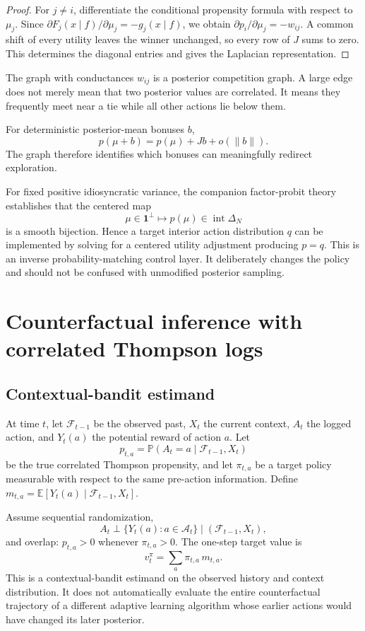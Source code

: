 \documentclass[11pt]{article}
\newcommand{\E}{\mathbb{E}}
\newcommand{\Prob}{\mathbb{P}}
\newcommand{\ind}{\mathbf{1}}
\begin{document}
\begin{proof}
For $j \ne i$, differentiate the conditional propensity formula with respect to $\mu_j$. Since $\partial F_j(x \mid f) / \partial \mu_j = -g_j(x \mid f)$, we obtain $\partial p_i / \partial \mu_j = -w_{ij}$. A common shift of every utility leaves the winner unchanged, so every row of $J$ sums to zero. This determines the diagonal entries and gives the Laplacian representation.
\end{proof}

The graph with conductances $w_{ij}$ is a posterior competition graph. A large edge does not merely mean that two posterior values are correlated. It means they frequently meet near a tie while all other actions lie below them.

For deterministic posterior-mean bonuses $b$,
\[
p(\mu + b) = p(\mu) + J b + o(\|b\|).
\]
The graph therefore identifies which bonuses can meaningfully redirect exploration.

For fixed positive idiosyncratic variance, the companion factor-probit theory \parencite{cotton2026probit} establishes that the centered map
\[
\mu \in \ind^\perp \longmapsto p(\mu) \in \operatorname{int} \Delta_N
\]
is a smooth bijection. Hence a target interior action distribution $q$ can be implemented by solving for a centered utility adjustment producing $p = q$. This is an inverse probability-matching control layer. It deliberately changes the policy and should not be confused with unmodified posterior sampling.

\section{Counterfactual inference with correlated Thompson logs}
\label{sec:counterfactual}

\subsection{Contextual-bandit estimand}

At time $t$, let $\mathcal{F}_{t-1}$ be the observed past, $X_t$ the current context, $A_t$ the logged action, and $Y_t(a)$ the potential reward of action $a$. Let
\[
p_{t,a} = \Prob(A_t = a \mid \mathcal{F}_{t-1}, X_t)
\]
be the true correlated Thompson propensity, and let $\pi_{t,a}$ be a target policy measurable with respect to the same pre-action information. Define $m_{t,a} = \E[Y_t(a) \mid \mathcal{F}_{t-1}, X_t]$.

Assume sequential randomization,
\[
A_t \perp \{Y_t(a) : a \in \mathcal{A}_t\} \mid (\mathcal{F}_{t-1}, X_t),
\]
and overlap: $p_{t,a} > 0$ whenever $\pi_{t,a} > 0$. The one-step target value is
\[
v_t^\pi = \sum_a \pi_{t,a}\, m_{t,a}.
\]
This is a contextual-bandit estimand on the observed history and context distribution. It does not automatically evaluate the entire counterfactual trajectory of a different adaptive learning algorithm whose earlier actions would have changed its later posterior.
\end{document}
